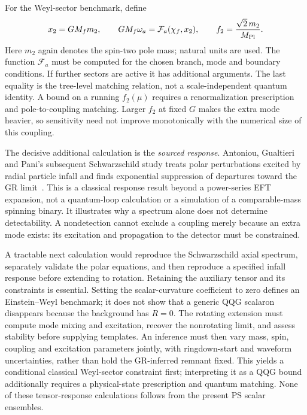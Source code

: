 For the Weyl-sector benchmark, define
\begin{equation}
 x_2=GM_fm_2,\qquad
 GM_f\omega_a=\mathcal{F}_a(\chi_f,x_2),\qquad
 f_2=\frac{\sqrt{2}\,m_2}{M_{\rm Pl}}.
 \label{eq:weyl-ringdown-map}
\end{equation}
Here $m_2$ again denotes the spin-two pole mass; natural units are used.  The function $\mathcal{F}_a$ must be computed for the chosen branch, mode and boundary conditions.  If further sectors are active it has additional arguments.  The last equality is the tree-level matching relation, not a scale-independent quantum identity.  A bound on a running $f_2(\mu)$ requires a renormalization prescription and pole-to-coupling matching.  Larger $f_2$ at fixed $G$ makes the extra mode heavier, so sensitivity need not improve monotonically with the numerical size of this coupling.

The decisive additional calculation is the \emph{sourced response}.  Antoniou, Gualtieri and Pani's subsequent Schwarzschild study treats polar perturbations excited by radial particle infall and finds exponential suppression of departures toward the GR limit~\cite{AntoniouGualtieriPani:2026}.  This is a classical response result beyond a power-series EFT expansion, not a quantum-loop calculation or a simulation of a comparable-mass spinning binary.  It illustrates why a spectrum alone does not determine detectability.  A nondetection cannot exclude a coupling merely because an extra mode exists: its excitation and propagation to the detector must be constrained.

A tractable next calculation would reproduce the Schwarzschild axial spectrum, separately validate the polar equations, and then reproduce a specified infall response before extending to rotation.  Retaining the auxiliary tensor and its constraints is essential.  Setting the scalar-curvature coefficient to zero defines an Einstein--Weyl benchmark; it does not show that a generic QQG scalaron disappears because the background has $R=0$.  The rotating extension must compute mode mixing and excitation, recover the nonrotating limit, and assess stability before supplying templates.  An inference must then vary mass, spin, coupling and excitation parameters jointly, with ringdown-start and waveform uncertainties, rather than hold the GR-inferred remnant fixed.  This yields a conditional classical Weyl-sector constraint first; interpreting it as a QQG bound additionally requires a physical-state prescription and quantum matching.  None of these tensor-response calculations follows from the present PS scalar ensembles.

